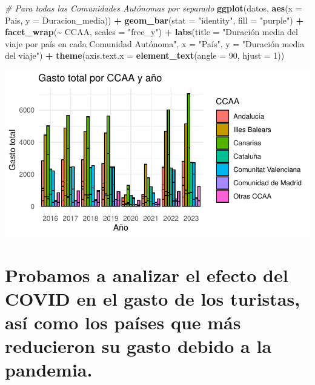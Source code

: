 \documentclass[data,article,submit,moreauthors,pdftex]{Definitions/mdpi}
\newenvironment{Shaded}{\begin{snugshade}}{\end{snugshade}}
\newcommand{\AttributeTok}[1]{\textcolor[rgb]{0.13,0.29,0.53}{#1}}
\newcommand{\CommentTok}[1]{\textcolor[rgb]{0.56,0.35,0.01}{\textit{#1}}}
\newcommand{\DecValTok}[1]{\textcolor[rgb]{0.00,0.00,0.81}{#1}}
\newcommand{\FunctionTok}[1]{\textcolor[rgb]{0.13,0.29,0.53}{\textbf{#1}}}
\newcommand{\NormalTok}[1]{#1}
\newcommand{\SpecialCharTok}[1]{\textcolor[rgb]{0.81,0.36,0.00}{\textbf{#1}}}
\newcommand{\StringTok}[1]{\textcolor[rgb]{0.31,0.60,0.02}{#1}}
\begin{document}
\begin{Shaded}
\begin{Highlighting}[]
\CommentTok{\# Para todas las Comunidades Autónomas por separado}
\FunctionTok{ggplot}\NormalTok{(datos, }\FunctionTok{aes}\NormalTok{(}\AttributeTok{x =}\NormalTok{ Pais, }\AttributeTok{y =}\NormalTok{ Duracion\_media)) }\SpecialCharTok{+} 
  \FunctionTok{geom\_bar}\NormalTok{(}\AttributeTok{stat =} \StringTok{"identity"}\NormalTok{, }\AttributeTok{fill =} \StringTok{"purple"}\NormalTok{) }\SpecialCharTok{+}
  \FunctionTok{facet\_wrap}\NormalTok{(}\SpecialCharTok{\textasciitilde{}}\NormalTok{ CCAA, }\AttributeTok{scales =} \StringTok{"free\_y"}\NormalTok{) }\SpecialCharTok{+}  
  \FunctionTok{labs}\NormalTok{(}\AttributeTok{title =} \StringTok{"Duración media del viaje por país en cada Comunidad Autónoma"}\NormalTok{, }
       \AttributeTok{x =} \StringTok{"País"}\NormalTok{, }
       \AttributeTok{y =} \StringTok{"Duración media del viaje"}\NormalTok{) }\SpecialCharTok{+}
  \FunctionTok{theme}\NormalTok{(}\AttributeTok{axis.text.x =} \FunctionTok{element\_text}\NormalTok{(}\AttributeTok{angle =} \DecValTok{90}\NormalTok{, }\AttributeTok{hjust =} \DecValTok{1}\NormalTok{))}
\end{Highlighting}
\end{Shaded}

\includegraphics{ProyectoAED2024_Rmd_files/figure-latex/unnamed-chunk-22-1.pdf}

\hypertarget{probamos-a-analizar-el-efecto-del-covid-en-el-gasto-de-los-turistas-asuxed-como-los-pauxedses-que-muxe1s-reducieron-su-gasto-debido-a-la-pandemia.}{%
\section{Probamos a analizar el efecto del COVID en el gasto de los
turistas, así como los países que más reducieron su gasto debido a la
pandemia.}\label{probamos-a-analizar-el-efecto-del-covid-en-el-gasto-de-los-turistas-asuxed-como-los-pauxedses-que-muxe1s-reducieron-su-gasto-debido-a-la-pandemia.}}
\end{document}
